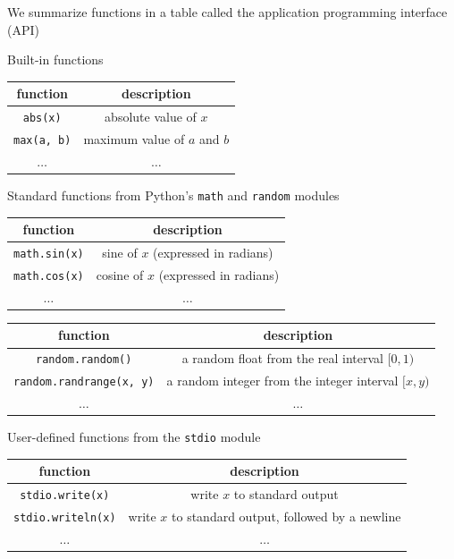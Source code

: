 \documentclass[8pt,a4paper,compress]{beamer}
\begin{document}
\begin{frame}[fragile]
\pause

We summarize functions in a table called the application programming interface (API)

\pause\bigskip

Built-in functions

\begin{center}
\begin{tabular}{cc}
function & description \\ \hline
\lstinline$abs(x)$ & absolute value of $x$ \\
\lstinline$max(a, b)$ & maximum value of $a$ and $b$ \\
$\dots$ & $\dots$
\end{tabular} 
\end{center}

\pause\smallskip

Standard functions from Python's \lstinline{math} and \lstinline{random} modules

\begin{center}
\begin{tabular}{cc}
function & description \\ \hline
\lstinline$math.sin(x)$ & sine of $x$ (expressed in radians) \\
\lstinline$math.cos(x)$ & cosine of $x$ (expressed in radians) \\
$\dots$ & $\dots$
\end{tabular} 

\begin{tabular}{cc}
function & description \\ \hline
\lstinline$random.random()$ & a random float from the real interval $[0, 1)$ \\
\lstinline$random.randrange(x, y)$ & a random integer from the integer interval $[x, y)$ \\
$\dots$ & $\dots$
\end{tabular} 
\end{center}

\pause\smallskip

User-defined functions from the \lstinline{stdio} module

\begin{center}
\begin{tabular}{cc}
function & description \\ \hline
\lstinline$stdio.write(x)$ & write $x$ to standard output \\
\lstinline$stdio.writeln(x)$ & write $x$ to standard output, followed by a newline \\
$\dots$ & $\dots$
\end{tabular} 
\end{center}
\end{frame}
\end{document}
